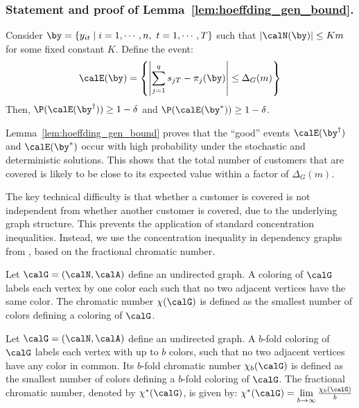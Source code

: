 \documentclass[blindrev]{informs3noheader}
\begin{document}
\subsubsection*{Statement and proof of Lemma~\ref{lem:hoeffding_gen_bound}.}

\begin{lemma}\label{lem:hoeffding_gen_bound}
Consider $\by=\{y_{it}\mid i=1,\cdots,n,\ t=1,\cdots,T\}$ such that $|\calN(\by)|\leq Km$ for some fixed constant $K$. Define the event:
\begin{equation}
\calE(\by)=\left\{\left|\sum_{j=1}^q s_{jT} - \pi_{j}(\by)\right|\leq \Delta_G(m)\right\}	\label{eq:Ek_gen}
\end{equation}
Then, $\P(\calE(\by^\dagger))\geq 1-\delta$ and $\P(\calE(\by^*))\geq 1-\delta$.
\end{lemma}

Lemma~\ref{lem:hoeffding_gen_bound} proves that the ``good'' events $\calE(\by^\dagger)$ and $\calE(\by^*)$ occur with high probability under the stochastic and deterministic solutions. This shows that the total number of customers that are covered is likely to be close to its expected value within a factor of $\Delta_G(m)$.

The key technical difficulty is that whether a customer is covered is not independent from whether another customer is covered, due to the underlying graph structure. This prevents the application of standard concentration inequalities. Instead, we use the concentration inequality in dependency graphs from \cite{janisch2024berry}, based on the fractional chromatic number.

\begin{definition}\label{def:chromatic}
Let $\calG=(\calN,\calA)$ define an undirected graph. A coloring of $\calG$ labels each vertex by one color each such that no two adjacent vertices have the same color. The chromatic number $\chi(\calG)$ is defined as the smallest number of colors defining a coloring of $\calG$.
\end{definition}

\begin{definition}\label{def:Fchromatic}
Let $\calG=(\calN,\calA)$ define an undirected graph. A $b$-fold coloring of $\calG$ labels each vertex with up to $b$ colors, such that no two adjacent vertices have any color in common. Its $b$-fold chromatic number $\chi_b(\calG)$ is defined as the smallest number of colors defining a $b$-fold coloring of $\calG$. The fractional chromatic number, denoted by $\chi^*(\calG)$, is given by: $\chi^*(\calG)=\lim\limits_{b\to\infty}\frac{\chi_b(\calG)}{b}$
\end{definition}
\end{document}
